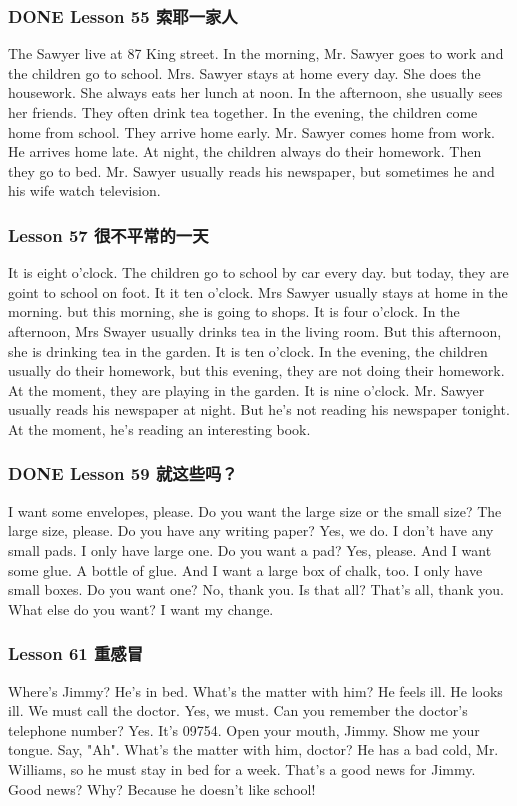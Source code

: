 \documentclass[11pt]{ctexart}
\begin{document}
\subsubsection{{\bfseries\sffamily DONE} Lesson 55 索耶一家人}
\label{sec:org785d3cf}
The Sawyer live at 87 King street.
In the morning, Mr. Sawyer goes to work and the children go to school.
Mrs. Sawyer stays at home every day.
She does the housework.
She always eats her lunch at noon.
In the afternoon, she usually sees her friends.
They often drink tea together.
In the evening, the children come home from school.
They arrive home early.
Mr. Sawyer comes home from work.
He arrives home late.
At night, the children always do their homework.
Then they go to bed.
Mr. Sawyer usually reads his newspaper,
but sometimes he and his wife watch television.
\subsubsection{Lesson 57 很不平常的一天}
\label{sec:org6519acc}
It is eight o'clock.
The children go to school by car every day.
but today, they are goint to school on foot.
It it ten o'clock. Mrs Sawyer usually stays at home in the morning.
but this morning, she is going to shops.
It is four o'clock.
In the afternoon, Mrs Swayer usually drinks tea in the living room.
But this afternoon, she is drinking tea in the garden.
It is ten o'clock.
In the evening, the children usually do their homework,
but this evening, they are not doing their homework.
At the moment, they are playing in the garden.
It is nine o'clock.
Mr. Sawyer usually reads his newspaper at night.
But he's not reading his newspaper tonight.
At the moment, he's reading an interesting book.
\subsubsection{{\bfseries\sffamily DONE} Lesson 59 就这些吗？}
\label{sec:org19882cf}
I want some envelopes, please.
Do you want the large size or the small size?
The large size, please.
Do you have any writing paper?
Yes, we do.
I don't have any small pads.
I only have large one.
Do you want a pad?
Yes, please.
And I want some glue.
A bottle of glue.
And I want a large box of chalk, too.
I only have small boxes.
Do you want one?
No, thank you.
Is that all?
That's all, thank you.
What else do you want?
I want my change.
\subsubsection{Lesson 61 重感冒}
\label{sec:orgb189d27}
Where's Jimmy?
He's in bed.
What's the matter with him?
He feels ill.
He looks ill.
We must call the doctor.
Yes, we must.
Can you remember the doctor's telephone number?
Yes. It's 09754.
Open your mouth, Jimmy.
Show me your tongue.
Say, "Ah".
What's the matter with him, doctor?
He has a bad cold, Mr. Williams,
so he must stay in bed for a week.
That's a good news for Jimmy.
Good news? Why?
Because he doesn't like school!
\end{document}
